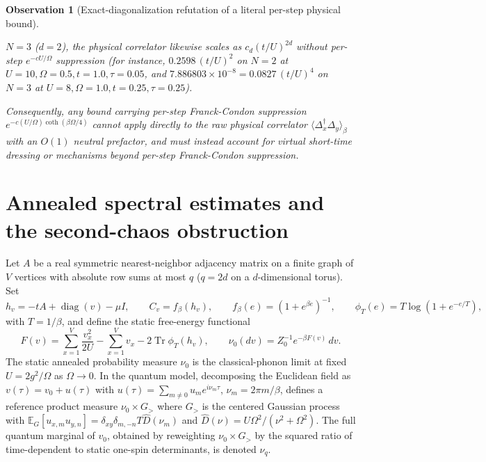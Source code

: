 \documentclass[11pt]{article}
\newtheorem{observation}[theorem]{Observation}
\theoremstyle{definition}
\theoremstyle{remark}
\DeclareMathOperator{\Tr}{Tr}
\DeclareMathOperator{\diag}{diag}
\newcommand{\E}{\mathbb{E}}
\newcommand{\Dop}{\Delta}
\begin{document}
\begin{observation}[Exact-diagonalization refutation of a literal per-step physical bound]
\begin{itemize}[leftmargin=1.5em]
$N=3$ ($d=2$), the physical correlator likewise scales as $c_d (t/U)^{2d}$
without per-step $e^{-c U/\Omega}$ suppression (for instance, $0.2598\,(t/U)^2$
on $N=2$ at $U=10,\Omega=0.5,t=1.0,\tau=0.05$, and $7.886803 \times 10^{-8} = 0.0827\,(t/U)^4$
on $N=3$ at $U=8,\Omega=1.0,t=0.25,\tau=0.25$).
\end{itemize}
Consequently, any bound carrying per-step Franck-Condon suppression
$e^{-c (U/\Omega)\coth(\beta\Omega/4)}$ cannot apply directly to the raw physical
correlator $\langle \Dop_x^\dagger \Dop_y \rangle_\beta$ with an $O(1)$
neutral prefactor, and must instead account for virtual short-time dressing or
mechanisms beyond per-step Franck-Condon suppression.
\end{observation}

\section{Annealed spectral estimates and the second-chaos obstruction}
\label{sec:annealed-spectral}

Let $A$ be a real symmetric nearest-neighbor adjacency matrix on a finite graph
of $V$ vertices with absolute row sums at most $q$ ($q = 2d$ on a $d$-dimensional
torus). Set
\[
h_v = -tA + \diag(v) - \mu I, \qquad
C_v = f_\beta(h_v), \qquad
f_\beta(e) = (1 + e^{\beta e})^{-1}, \qquad
\phi_T(e) = T\log(1 + e^{-e/T}),
\]
with $T = 1/\beta$, and define the static free-energy functional
\[
F(v) = \sum_{x=1}^V \frac{v_x^2}{2U} - \sum_{x=1}^V v_x - 2\Tr\phi_T(h_v),
\qquad
\nu_0(dv) = Z_0^{-1} e^{-\beta F(v)}\,dv.
\]
The static annealed probability measure $\nu_0$ is the classical-phonon limit at
fixed $U = 2g^2/\Omega$ as $\Omega \to 0$. In the quantum model, decomposing
the Euclidean field as $v(\tau) = v_0 + u(\tau)$ with
$u(\tau) = \sum_{m \ne 0} u_m e^{i\nu_m \tau}$, $\nu_m = 2\pi m/\beta$,
defines a reference product measure $\nu_0 \times G_>$ where $G_>$ is the
centered Gaussian process with $\E_G[u_{x,m} u_{y,n}] = \delta_{xy}\delta_{m,-n} T \hat{D}(\nu_m)$
and $\hat{D}(\nu) = U\Omega^2/(\nu^2+\Omega^2)$. The full quantum marginal of
$v_0$, obtained by reweighting $\nu_0 \times G_>$ by the squared ratio of
time-dependent to static one-spin determinants, is denoted $\nu_q$.
\end{document}

